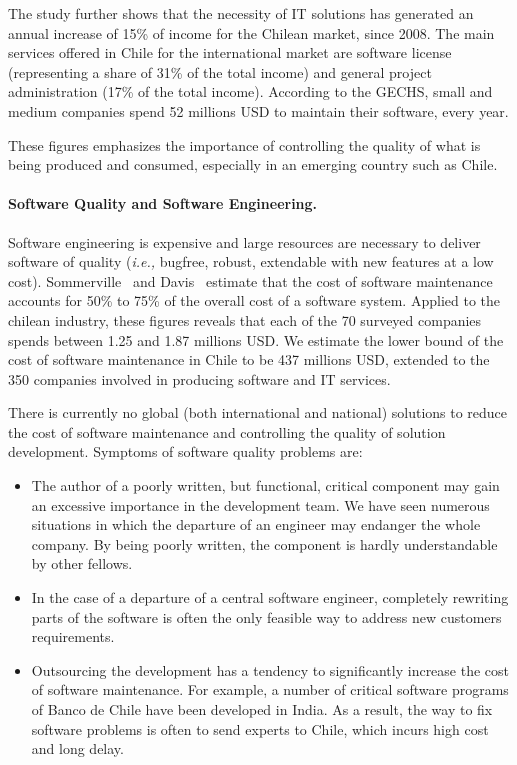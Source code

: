 \documentclass[runningheads]{llncs}
\newcommand{\ie}{\emph{i.e.,}\xspace}
\begin{document}
The study further shows that the necessity of IT solutions has generated an annual increase of 15\% of income for the Chilean market, since 2008. The main services offered in Chile for the international market are software license (representing a share of 31\% of the total income) and general project administration (17\% of the total income). According to the GECHS, small and medium companies spend 52 millions USD to maintain their software, every year.

These figures emphasizes the importance of controlling the quality of what is being produced and consumed, especially in an emerging country such as Chile.%

\paragraph{Software Quality and Software Engineering.}
Software engineering is expensive and large resources are necessary to deliver software of quality (\ie bugfree, robust, extendable with new features at a low cost). Sommerville~\cite{Somm00a} and Davis~\cite{Davi95a} estimate that the cost of software maintenance accounts for 50\% to 75\% of the overall cost of a software system. Applied to the chilean industry, these figures reveals that each of the 70 surveyed companies spends between 1.25 and 1.87 millions USD. We estimate the lower bound of the cost of software maintenance in Chile to be 437 millions USD, extended to the 350 companies involved in producing software and IT services. 

There is currently no global (both international and national) solutions to reduce the cost of software maintenance and controlling the quality of solution development. Symptoms of software quality problems are:

\begin{itemize}
\item The author of a poorly written, but functional, critical component may gain an excessive importance in the development team. We have seen numerous situations in which the departure of an engineer may endanger the whole company. By being poorly written, the component is hardly understandable by other fellows. 

\item In the case of a departure of a central software engineer, completely rewriting parts of the software is often the only feasible way to address new customers requirements.

\item Outsourcing the development has a tendency to significantly increase the cost of software maintenance. For example, a number of critical software programs of Banco de Chile have been developed in India. As a result, the way to fix software problems is often to send experts to Chile, which incurs high cost and long delay.
\end{itemize}
\end{document}
